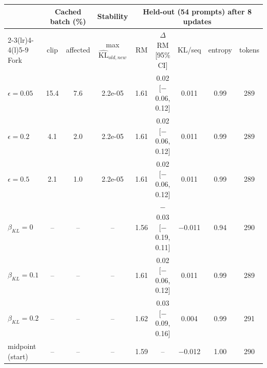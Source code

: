 \begin{tabular}{@{}lcccccccc@{}}
\toprule
 & \multicolumn{2}{c}{Cached batch (\%)} & Stability & \multicolumn{5}{c}{Held-out (54 prompts) after 8 updates} \\
\cmidrule(lr){2-3}\cmidrule(lr){4-4}\cmidrule(l){5-9}
Fork & clip & affected & max $\widehat{\mathrm{KL}}_{old,new}$ & RM & $\Delta$RM [95\% CI] & KL/seq & entropy & tokens \\
\midrule
$\epsilon=0.05$ & 15.4 & 7.6 & 2.2e-05 & 1.61 & 0.02 [$-$0.06, 0.12] & 0.011 & 0.99 & 289 \\
$\epsilon=0.2$ & 4.1 & 2.0 & 2.2e-05 & 1.61 & 0.02 [$-$0.06, 0.12] & 0.011 & 0.99 & 289 \\
$\epsilon=0.5$ & 2.1 & 1.0 & 2.2e-05 & 1.61 & 0.02 [$-$0.06, 0.12] & 0.011 & 0.99 & 289 \\
\midrule
$\beta_{KL}=0$ & -- & -- & -- & 1.56 & $-$0.03 [$-$0.19, 0.11] & $-$0.011 & 0.94 & 290 \\
$\beta_{KL}=0.1$ & -- & -- & -- & 1.61 & 0.02 [$-$0.06, 0.12] & 0.011 & 0.99 & 289 \\
$\beta_{KL}=0.2$ & -- & -- & -- & 1.62 & 0.03 [$-$0.09, 0.16] & 0.004 & 0.99 & 291 \\
\midrule
midpoint (start) & -- & -- & -- & 1.59 & -- & $-$0.012 & 1.00 & 290 \\
\bottomrule
\end{tabular}
